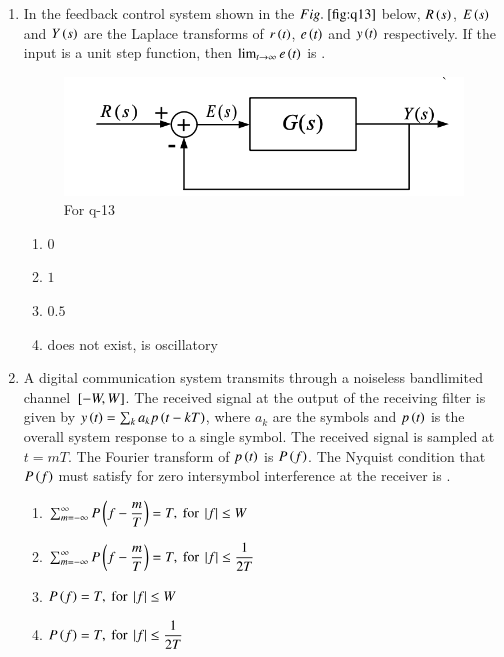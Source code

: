 \documentclass[journal,12pt,onecolumn]{IEEEtran}
\theoremstyle{remark}
\begin{document}
\begin{enumerate}
\item In the feedback control system shown in the $\figref{fig:q13}$ below, $R\left(s\right)$, $E\left(s\right)$ and $Y\left(s\right)$ are the Laplace transforms of $r\left(t\right)$, $e\left(t\right)$ and $y\left(t\right)$ respectively. If the input is a unit step function, then $\lim_{t \to \infty} e\left(t\right)$ is \underline{\hspace{2cm}}.
\begin{figure}[H]
    \centering
    \includegraphics[width=0.5\columnwidth]{q13.png}
    \caption{For q-13}
    \label{fig:q13}
\end{figure}
\hfill{}
\begin{multicols}{2}
  \begin{enumerate}
    \item $0$
    \item $1$
    \item $0.5$
    \item does not exist, is oscillatory
\end{enumerate}  
\end{multicols}


\item A digital communication system transmits through a noiseless bandlimited channel ${}\left[-W, W\right]$. The received signal at the output of the receiving filter is given by $y\left(t\right) = \sum_{k} a_k p\left(t - kT\right)$, where $a_k$ are the symbols and $p\left(t\right)$ is the overall system response to a single symbol. The received signal is sampled at $t = mT$. The Fourier transform of $p\left(t\right)$ is $P\left(f\right)$. The Nyquist condition that $P\left(f\right)$ must satisfy for zero intersymbol interference at the receiver is \underline{\hspace{2cm}}.
\hfill{}
\begin{enumerate}
    \item $\sum_{m=-\infty}^{\infty} P\left(f-\dfrac{m}{T}\right) = T, \text{ for } \left\vert f\right\vert \leq W$
    \item $\sum_{m=-\infty}^{\infty} P\left(f-\dfrac{m}{T}\right) = T, \text{ for } \left\vert f\right\vert \leq \dfrac{1}{2T}$
    \item $P\left(f\right) = T, \text{ for } \left\vert f\right\vert \leq W$
    \item $P\left(f\right) = T, \text{ for } \left\vert f\right\vert \leq \dfrac{1}{2T}$
\end{enumerate}


\end{enumerate}
\end{document}
